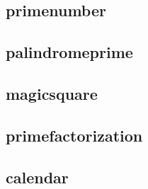     \subsection{primenumber}
        
    \subsection{palindromeprime}
        
    \subsection{magicsquare}
        
    \subsection{primefactorization}
        
    \subsection{calendar}
        
        
        
        